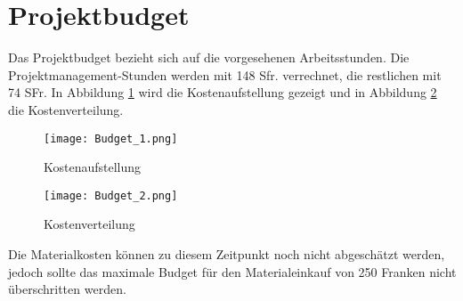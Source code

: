 \section{Projektbudget}

Das Projektbudget bezieht sich auf die vorgesehenen Arbeitsstunden. Die Projektmanagement-Stunden werden mit 148 Sfr. verrechnet, die restlichen mit 74 SFr. In Abbildung \ref{fig::Budget_1} wird die Kostenaufstellung gezeigt und in Abbildung \ref{fig::Budget_2} die Kostenverteilung.


\begin{figure}[h] 
\centering
\texttt{[image: Budget\_1.png]}%
\caption{Kostenaufstellung}%
\label{fig::Budget_1}%
\end{figure}

\begin{figure}[h] 
\centering
\texttt{[image: Budget\_2.png]}%
\caption{Kostenverteilung}%
\label{fig::Budget_2}%
\end{figure}

Die Materialkosten können zu diesem Zeitpunkt noch nicht abgeschätzt werden, jedoch sollte das maximale Budget für den Materialeinkauf von 250 Franken nicht überschritten werden.